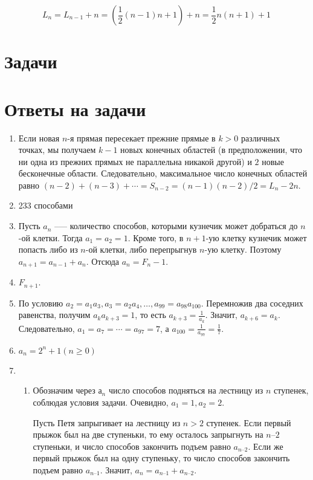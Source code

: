 \documentclass[14pt,openany]{book}
\begin{document}
$$
L_n = L_{n-1} + n = \left(\frac{1}{2}(n-1)n+1 \right)+n = \frac{1}{2}n(n+1) + 1
$$

\section{Задачи}



\section{Ответы на задачи}

\begin{enumerate}
\item Если новая $n$-я прямая пересекает прежние прямые в $k>0$ различных точках,
мы получаем $k-1$ новых конечных областей (в предположении, что ни одна из прежних прямых
не параллельна никакой другой) и $2$ новые бесконечные области. Следовательно, максимальное
число конечных областей равно $(n-2) + (n-3) + \cdots = S_{n-2} = (n-1)(n-2)/2 = L_n-2n$.

\item 233 способами

\item Пусть $a_n$ --— количество способов, которыми кузнечик может добраться до $n$-ой клетки. Тогда $a_1 = a_2 = 1$. Кроме того, в $n+1$-ую клетку кузнечик может попасть либо из $n$-ой клетки, либо перепрыгнув $n$-ую клетку. Поэтому $a_{n + 1} = a_{n - 1} + a_n$. Отсюда $a_n = F_n - 1$. 

\item $F_{n + 1}$.

\item По условию  $a_2 = a_1a_3, a_3 = a_2a_4, \ldots, a_{99} = a_{98}a_{100}$.
      Перемножив два соседних равенства, получим $a_ka_{k+3} = 1$,  то есть 
      $a_{k+3} = \frac{1}{a_k}$. Значит, $a_{k+6} = a_k$. 
      Следовательно, $a_1 = a_7 = \cdots = a_{97} = 7$,
      а $a_{100} = \frac{1}{a_{97}} = \frac{1}{7}$.

\item $a_n = 2^n + 1 (n \ge 0)$

\item \begin{enumerate}
    \item Обозначим через $а_n$ число способов подняться на лестницу из $n$ ступенек, соблюдая условия задачи. Очевидно,  $a_1 = 1,  a_2 = 2$.
    
   Пусть Петя запрыгивает на лестницу из $n > 2$  ступенек. Если первый прыжок был на две ступеньки, то ему осталось запрыгнуть на  $n – 2$  ступеньки, и число способов закончить подъем равно $a_{n–2}$. Если же первый прыжок был на одну ступеньку, то число способов закончить подъем равно $a_{n–1}$. Значит, $a_n = a_{n–1} + a_{n–2}$.


\end{enumerate}
\end{enumerate}
\end{document}
